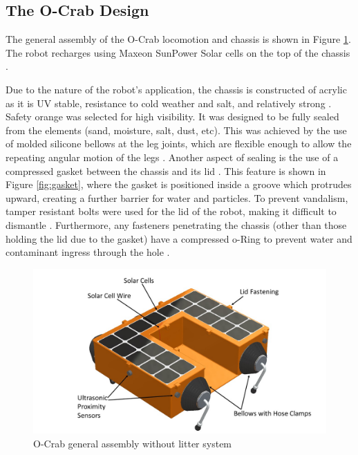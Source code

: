 \subsection{The O-Crab Design} \label{subsec:solution}

The general assembly of the O-Crab locomotion and chassis is shown in Figure \ref{fig:general}. The robot recharges using Maxeon SunPower Solar cells on the top of the chassis \cite{sunpower_solar_2018}. 

Due to the nature of the robot's application, the chassis is constructed of acrylic as it is UV stable, resistance to cold weather and salt, and relatively strong \cite{marla_acme_best_2019} \cite{curbell_plastics_uv_2019}. Safety orange was selected for high visibility. It was designed to be fully sealed from the elements (sand, moisture, salt, dust, etc). This was achieved by the use of molded silicone bellows at the leg joints, which are flexible enough to allow the repeating angular motion of the legs \cite{custom_rubber_corp_rubber_2019}. Another aspect of sealing is the use of a compressed gasket between the chassis and its lid \cite{protocase_custom_2019}. This feature is shown in Figure \ref{fig:gasket}, where the gasket is positioned inside a groove which protrudes upward, creating a further barrier for water and particles. To prevent vandalism, tamper resistant bolts were used for the lid of the robot, making it difficult to dismantle \cite{mcmaster-carr_tamper_2019}. Furthermore, any fasteners penetrating the chassis (other than those holding the lid due to the gasket) have a compressed o-Ring to prevent water and contaminant ingress through the hole \cite{fastenright_sealing_nodate}. 


\begin{figure}[H]
    \centering
    \includegraphics[width=\textwidth]{2_ProposedDesign/img/IsoViewA.jpg}
    \caption{O-Crab general assembly without litter system}
    \label{fig:general}
\end{figure}

